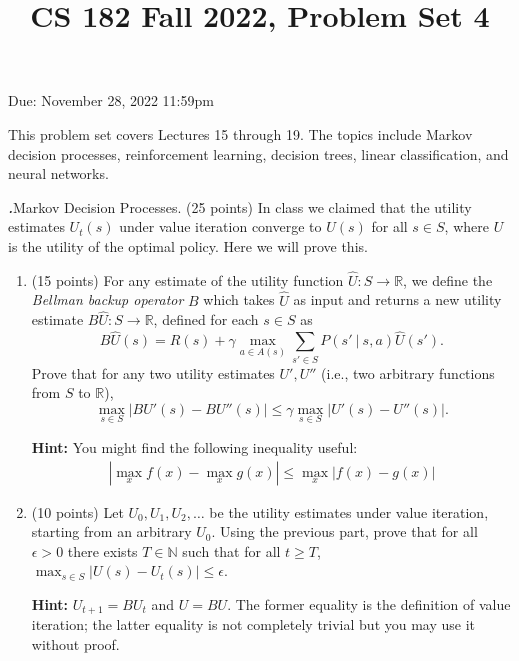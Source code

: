 \documentclass[12pt]{amsart}
\title{CS 182 Fall 2022, Problem Set 4}
\newenvironment{statement}[1]{\smallskip\noindent\color[rgb]{0.0,0.0,0.0} {\bf #1.}}{}
\newcommand{\1}{\mathds{1}}
\begin{document}
\maketitle

\vspace*{-0.25in}
\centerline{Due: November 28, 2022 11:59pm}

\begin{center}
\end{center}
\vspace*{0.15in}


\noindent This problem set covers Lectures 15 through 19. The topics include Markov decision processes, reinforcement learning, decision trees, linear classification, and neural networks.
\vspace*{0.35in}


\begin{statement}{1} \emph{Markov Decision Processes.} (25 points) 
In class we claimed that the utility estimates $U_t(s)$ under value iteration converge to $U(s)$ for all $s\in S$, where $U$ is the utility of the optimal policy. Here we will prove this. 

\begin{enumerate}
\item (15 points) For any estimate of the utility function $\hat{U}:S\rightarrow \mathbb{R}$, we define the \emph{Bellman backup operator} $B$ which takes $\hat{U}$ as input and returns a new utility estimate $B\hat{U}:S\rightarrow \mathbb{R}$, defined for each $s\in S$ as
$$
B\hat{U}(s)=R(s) + \gamma \max_{a\in A(s)}\sum_{s'\in S}P(s'\ |\ s,a)\hat{U}(s').
$$
Prove that for any two utility estimates $U',U''$ (i.e., two arbitrary functions from $S$ to $\mathbb{R}$),
$$
\max_{s\in S}|BU'(s)-BU''(s)|\leq \gamma \max_{s\in S}|U'(s)-U''(s)|.
$$

\noindent \textbf{Hint:} You might find the following inequality useful:
\begin{align*}
|\max_x f(x) - \max_x g(x)| \le \max_x |f(x) - g(x)|
\end{align*}

\item (10 points) Let $U_0,U_1,U_2,\ldots$ be the utility estimates under value iteration, starting from an arbitrary $U_0$.  Using the previous part, prove that for all $\epsilon >0$ there exists $T\in \mathbb{N}$ such that for all $t\geq T$, $\max_{s\in S}|U(s)-U_t(s)|\leq \epsilon$.

\noindent \textbf{Hint:} $U_{t+1}=BU_t$ and $U=BU$. The former equality is the definition of value iteration; the latter equality is not completely trivial but you may use it without proof. 
\end{enumerate}
\end{statement}
\end{document}
